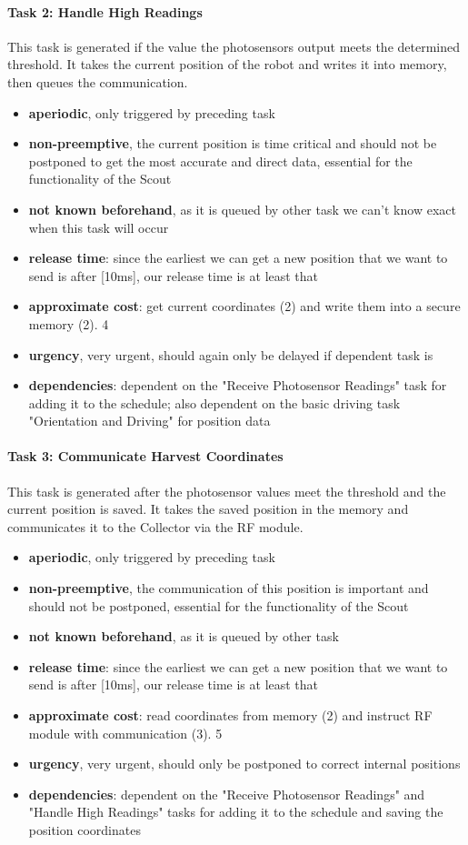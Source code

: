 \documentclass[12pt]{article}
\begin{document}
\paragraph{Task 2: Handle High Readings}
This task is generated if the value the photosensors output meets the determined threshold. It takes the current position of the robot and writes it into memory, then queues the communication.
\begin{itemize}
	\item \textbf{aperiodic}, only triggered by preceding task
	\item \textbf{non-preemptive}, the current position is time critical and should not be postponed to get the most accurate and direct data, essential for the functionality of the Scout
	\item \textbf{not known beforehand}, as it is queued by other task we can't know exact when this task will occur
	\item \textbf{release time}: since the earliest we can get a new position that we want to send is after [10ms], our release time is at least that
	\item \textbf{approximate cost}: get current coordinates (2) and write them into a secure memory (2). 4
	\item \textbf{urgency}, very urgent, should again only be delayed if dependent task is
	\item \textbf{dependencies}: dependent on the "Receive Photosensor Readings" task for adding it to the schedule; also dependent on the basic driving task "Orientation and Driving" for position data
\end{itemize}

\paragraph{Task 3: Communicate Harvest Coordinates}
This task is generated after the photosensor values meet the threshold and the current position is saved. It takes the saved position in the memory and communicates it to the Collector via the RF module.
\begin{itemize}
	\item \textbf{aperiodic}, only triggered by preceding task
	\item \textbf{non-preemptive}, the communication of this position is important and should not be postponed, essential for the functionality of the Scout
	\item \textbf{not known beforehand}, as it is queued by other task
	\item \textbf{release time}: since the earliest we can get a new position that we want to send is after [10ms], our release time is at least that
	\item \textbf{approximate cost}: read coordinates from memory (2) and instruct RF module with communication (3). 5
	\item \textbf{urgency}, very urgent, should only be postponed to correct internal positions
	\item \textbf{dependencies}: dependent on the "Receive Photosensor Readings" and "Handle High Readings" tasks for adding it to the schedule and saving the position coordinates
\end{itemize}
\end{document}
